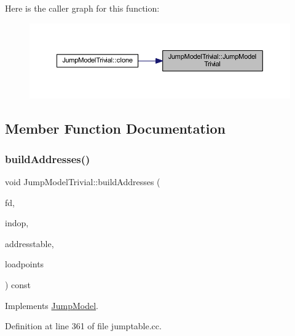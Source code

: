 Here is the caller graph for this function\+:
\nopagebreak
\begin{figure}[H]
\begin{center}
\leavevmode
\includegraphics[width=350pt]{class_jump_model_trivial_a23f15dcccc30e8496c1c2e983bcfa20b_icgraph}
\end{center}
\end{figure}


\subsection{Member Function Documentation}
\mbox{\label{class_jump_model_trivial_a598ff420975134b8921c4a5ade192e0f}} 
\subsubsection{\texorpdfstring{buildAddresses()}{buildAddresses()}}
{\footnotesize\ttfamily void Jump\+Model\+Trivial\+::build\+Addresses (\begin{DoxyParamCaption}\item[{\mbox{\hyperlink{class_funcdata}{Funcdata}} $\ast$}]{fd,  }\item[{\mbox{\hyperlink{class_pcode_op}{Pcode\+Op}} $\ast$}]{indop,  }\item[{vector$<$ \mbox{\hyperlink{class_address}{Address}} $>$ \&}]{addresstable,  }\item[{vector$<$ \mbox{\hyperlink{class_load_table}{Load\+Table}} $>$ $\ast$}]{loadpoints }\end{DoxyParamCaption}) const\hspace{0.3cm}{\ttfamily [virtual]}}



Implements \mbox{\hyperlink{class_jump_model_a12659a93442cc2940a8fed8dc55be2e0}{Jump\+Model}}.



Definition at line 361 of file jumptable.\+cc.

